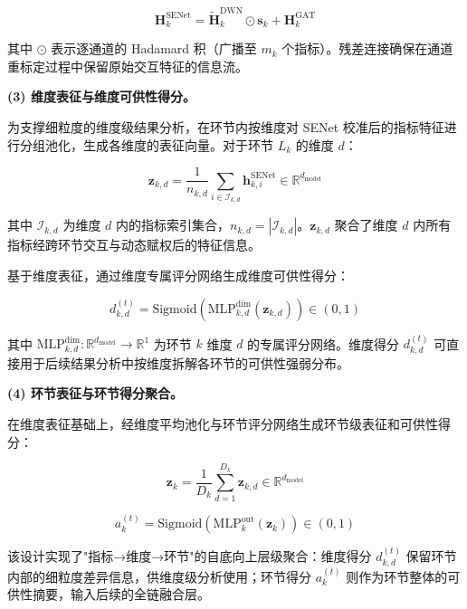 \begin{equation}
\mathbf{H}_k^{\text{SENet}} = \tilde{\mathbf{H}}_k^{\text{DWN}} \odot \mathbf{s}_k + \mathbf{H}_k^{\text{GAT}}
\end{equation}

其中 $\odot$ 表示逐通道的 Hadamard 积（广播至 $m_k$ 个指标）。残差连接确保在通道重标定过程中保留原始交互特征的信息流。

\textbf{(3) 维度表征与维度可供性得分。}

为支撑细粒度的维度级结果分析，在环节内按维度对 SENet 校准后的指标特征进行分组池化，生成各维度的表征向量。对于环节 $L_k$ 的维度 $d$：

\begin{equation}
\mathbf{z}_{k,d} = \frac{1}{n_{k,d}} \sum_{i\in\mathcal{I}_{k,d}} \mathbf{h}_{k,i}^{\text{SENet}} \in \mathbb{R}^{d_{\text{model}}}
\end{equation}

其中 $\mathcal{I}_{k,d}$ 为维度 $d$ 内的指标索引集合，$n_{k,d}=|\mathcal{I}_{k,d}|$。$\mathbf{z}_{k,d}$ 聚合了维度 $d$ 内所有指标经跨环节交互与动态赋权后的特征信息。

基于维度表征，通过维度专属评分网络生成维度可供性得分：

\begin{equation}
d_{k,d}^{(t)} = \text{Sigmoid}\left(\text{MLP}_{k,d}^{\text{dim}}\left(\mathbf{z}_{k,d}\right)\right) \in (0,1)
\end{equation}

其中 $\text{MLP}_{k,d}^{\text{dim}}:\mathbb{R}^{d_{\text{model}}}\to\mathbb{R}^{1}$ 为环节 $k$ 维度 $d$ 的专属评分网络。维度得分 $d_{k,d}^{(t)}$ 可直接用于后续结果分析中按维度拆解各环节的可供性强弱分布。

\textbf{(4) 环节表征与环节得分聚合。}

在维度表征基础上，经维度平均池化与环节评分网络生成环节级表征和可供性得分：

\begin{equation}
\mathbf{z}_k = \frac{1}{D_k} \sum_{d=1}^{D_k} \mathbf{z}_{k,d} \in \mathbb{R}^{d_{\text{model}}}
\end{equation}

\begin{equation}
a_k^{(t)} = \text{Sigmoid}\left(\text{MLP}_k^{\text{out}}\left(\mathbf{z}_k\right)\right) \in (0,1)
\end{equation}

该设计实现了"指标→维度→环节"的自底向上层级聚合：维度得分 $d_{k,d}^{(t)}$ 保留环节内部的细粒度差异信息，供维度级分析使用；环节得分 $a_k^{(t)}$ 则作为环节整体的可供性摘要，输入后续的全链融合层。

